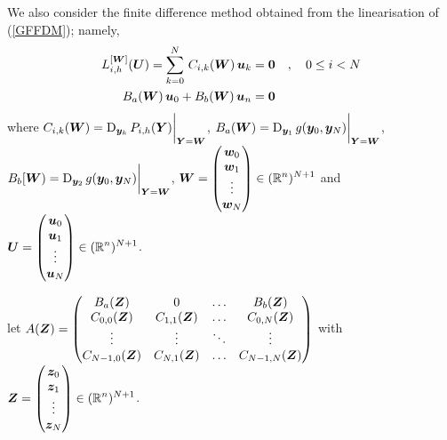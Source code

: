 We also consider the finite difference method obtained from the
linearisation of (\ref{GFFDM}); namely,
\begin{equation} \label{LinGFFDM}
\begin{split}
L^{[\bm{W}]}_{i,h} (\bm{U}) =
\sum_{k=0}^N\,C_{i,k}(\bm{W})\,\bm{u}_k &= \bm{0} \quad , \quad
0 \leq i < N \\
B_a(\bm{W}) \,\bm{u}_0 + B_b(\bm{W})\,\bm{u}_n &= \bm{0}
\end{split}
\end{equation}
where
$\displaystyle C_{i,k}(\bm{W}) = \operatorname{D}_{\bm{y}_k}
P_{i,h}(\bm{Y})\bigg|_{\bm{Y}=\bm{W}}$,
$\displaystyle B_a(\bm{W}) = \operatorname{D}_{\bm{y}_1}
g(\bm{y}_0,\bm{y}_N)\bigg|_{\bm{Y}=\bm{W}}$,\\
$\displaystyle B_b[\bm{W}) = \operatorname{D}_{\bm{y}_2}
g(\bm{y}_0,\bm{y}_N)\bigg|_{\bm{Y}=\bm{W}}$,
$\displaystyle \bm{W} = \begin{pmatrix} \bm{w}_0 \\
\bm{w}_1 \\ \vdots \\ \bm{w}_N \end{pmatrix} \in (\mathbb{R}^n)^{N+1}$
and
$\displaystyle \bm{U} = \begin{pmatrix} \bm{u}_0 \\
\bm{u}_1 \\ \vdots \\ \bm{u}_N \end{pmatrix} \in (\mathbb{R}^n)^{N+1}$.

let
$\displaystyle
A(\bm{Z}) = \begin{pmatrix}
B_a(\bm{Z}) & 0 & \ldots & B_b(\bm{Z}) \\
C_{0,0}(\bm{Z}) & C_{1,1}(\bm{Z}) & \ldots & C_{0,N}(\bm{Z}) \\
\vdots & \vdots & \ddots & \vdots \\
C_{N-1,0}(\bm{Z}) & C_{N,1}(\bm{Z}) & \ldots & C_{N-1,N}(\bm{Z})
\end{pmatrix}$ with
$\displaystyle \bm{Z} = \begin{pmatrix} \bm{z}_0 \\ \bm{z}_1\\
\vdots \\ \bm{z}_N \end{pmatrix} \in (\mathbb{R}^n)^{N+1}$.

